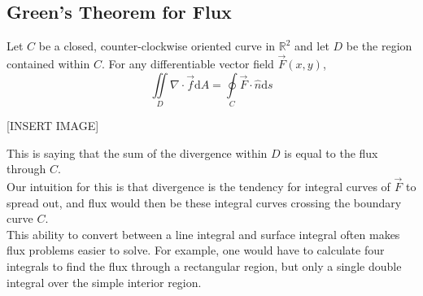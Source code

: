 \subsection{Green's Theorem for Flux}
\begin{theorem}
	Let $C$ be a closed, counter-clockwise oriented curve in $\mathbb{R}^2$ and let $D$ be the region contained within $C$. For any differentiable vector field $\vec{F}(x,y)$,
	\begin{equation*}
		\iint\limits_{D}{\nabla \cdot \vec{f}\mathrm{d}A} = \oint\limits_{C}{\vec{F} \cdot \hat{n}\mathrm{d}s}
	\end{equation*}
\end{theorem}

[INSERT IMAGE]

\noindent
This is saying that the sum of the divergence within $D$ is equal to the flux through $C$.\\
Our intuition for this is that divergence is the tendency for integral curves of $\vec{F}$ to spread out, and flux would then be these integral curves crossing the boundary curve $C$.\\

\noindent
This ability to convert between a line integral and surface integral often makes flux problems easier to solve. For example, one would have to calculate four integrals to find the flux through a rectangular region, but only a single double integral over the simple interior region.